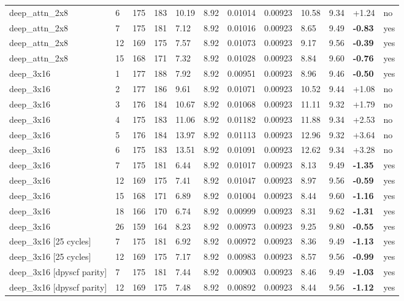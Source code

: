 \documentclass[10pt,a4paper]{article}
\begin{document}
\begin{landscape}
\begin{scriptsize}
\begin{longtable}{llllllllllll}
deep\_attn\_2x8 & 6 & 175 & 183 & 10.19 & 8.92 & 0.01014 & 0.00923 & 10.58 & 9.34 & +1.24 & no \\
deep\_attn\_2x8 & 7 & 175 & 181 & 7.12 & 8.92 & 0.01016 & 0.00923 & 8.65 & 9.49 & \textbf{-0.83} & yes \\
deep\_attn\_2x8 & 12 & 169 & 175 & 7.57 & 8.92 & 0.01073 & 0.00923 & 9.17 & 9.56 & \textbf{-0.39} & yes \\
deep\_attn\_2x8 & 15 & 168 & 171 & 7.32 & 8.92 & 0.01028 & 0.00923 & 8.84 & 9.60 & \textbf{-0.76} & yes \\
deep\_3x16 & 1 & 177 & 188 & 7.92 & 8.92 & 0.00951 & 0.00923 & 8.96 & 9.46 & \textbf{-0.50} & yes \\
deep\_3x16 & 2 & 177 & 186 & 9.61 & 8.92 & 0.01071 & 0.00923 & 10.52 & 9.44 & +1.08 & no \\
deep\_3x16 & 3 & 176 & 184 & 10.67 & 8.92 & 0.01068 & 0.00923 & 11.11 & 9.32 & +1.79 & no \\
deep\_3x16 & 4 & 175 & 183 & 11.06 & 8.92 & 0.01182 & 0.00923 & 11.88 & 9.34 & +2.53 & no \\
deep\_3x16 & 5 & 176 & 184 & 13.97 & 8.92 & 0.01113 & 0.00923 & 12.96 & 9.32 & +3.64 & no \\
deep\_3x16 & 6 & 175 & 183 & 13.51 & 8.92 & 0.01091 & 0.00923 & 12.62 & 9.34 & +3.28 & no \\
deep\_3x16 & 7 & 175 & 181 & 6.44 & 8.92 & 0.01017 & 0.00923 & 8.13 & 9.49 & \textbf{-1.35} & yes \\
deep\_3x16 & 12 & 169 & 175 & 7.41 & 8.92 & 0.01047 & 0.00923 & 8.97 & 9.56 & \textbf{-0.59} & yes \\
deep\_3x16 & 15 & 168 & 171 & 6.89 & 8.92 & 0.01004 & 0.00923 & 8.44 & 9.60 & \textbf{-1.16} & yes \\
deep\_3x16 & 18 & 166 & 170 & 6.74 & 8.92 & 0.00999 & 0.00923 & 8.31 & 9.62 & \textbf{-1.31} & yes \\
deep\_3x16 & 26 & 159 & 164 & 8.23 & 8.92 & 0.00973 & 0.00923 & 9.25 & 9.80 & \textbf{-0.55} & yes \\
deep\_3x16 [25 cycles] & 7 & 175 & 181 & 6.92 & 8.92 & 0.00972 & 0.00923 & 8.36 & 9.49 & \textbf{-1.13} & yes \\
deep\_3x16 [25 cycles] & 12 & 169 & 175 & 7.17 & 8.92 & 0.00983 & 0.00923 & 8.57 & 9.56 & \textbf{-0.99} & yes \\
deep\_3x16 [dpyscf parity] & 7 & 175 & 181 & 7.44 & 8.92 & 0.00903 & 0.00923 & 8.46 & 9.49 & \textbf{-1.03} & yes \\
deep\_3x16 [dpyscf parity] & 12 & 169 & 175 & 7.48 & 8.92 & 0.00892 & 0.00923 & 8.44 & 9.56 & \textbf{-1.12} & yes \\

\end{longtable}
\end{scriptsize}
\end{landscape}
\end{document}
